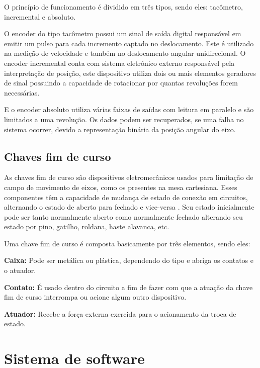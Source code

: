 O princípio de funcionamento é dividido em três tipos, sendo eles: tacômetro, incremental e absoluto.

O encoder do tipo tacômetro possui um sinal de saída digital responsável em emitir um pulso para cada 
incremento captado no deslocamento. Este é utilizado na medição de velocidade e também no deslocamento 
angular unidirecional. O encoder incremental conta com sistema eletrônico externo responsável pela 
interpretação de posição, este dispositivo utiliza dois ou mais elementos geradores de sinal possuindo 
a capacidade de rotacionar por quantas revoluções forem necessárias.

E o encoder absoluto utiliza várias faixas de saídas com leitura em paralelo e são limitados a uma revolução. 
Os dados podem ser recuperados, se uma falha no sistema ocorrer, devido a representação binária da posição 
angular do eixo.

\subsection{Chaves fim de curso}\label{subsec:metchaves}

As chaves fim de curso são dispositivos eletromecânicos usados para limitação de campo de movimento de eixos, 
como os presentes na mesa cartesiana. Esses componentes têm a capacidade de mudança de estado de conexão 
em circuitos, alternando o estado de aberto para fechado e vice-versa \cite{alciatore2014introduccao}. 
Seu estado inicialmente pode ser tanto normalmente aberto como normalmente fechado alterando seu estado 
por pino, gatilho, roldana, haste alavanca, etc. 

Uma chave fim de curso é composta basicamente por três elementos, sendo eles:

\begin{alineas}
    \item \textbf{Caixa:} Pode ser metálica ou plástica, dependendo do tipo e abriga os contatos e o atuador.
    \item \textbf{Contato:} É usado dentro do circuito a fim de fazer com que a atuação da chave fim de curso interrompa ou 
    acione algum outro dispositivo.
    \item \textbf{Atuador:} Recebe a força externa exercida para o acionamento da troca de estado.
\end{alineas}

\section{Sistema de software}\label{sec:metsissof}

